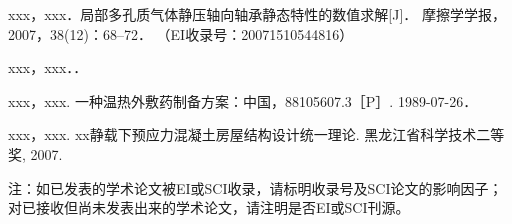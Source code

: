 


\begin{achievementlist}
\item[ {[1]} ]
xxx，xxx．局部多孔质气体静压轴向轴承静态特性的数值求解[J]．
摩擦学学报，2007，38(12)：68--72．
（EI收录号：20071510544816）
\item[ {[2]} ]
xxx，xxx．．
\end{achievementlist}


\begin{achievementlist}
\item[ {[1]} ]
xxx，xxx. 一种温热外敷药制备方案：中国，88105607.3［P］. 1989-07-26．
\end{achievementlist}

\begin{achievementlist}
\item[ {[1]} ]
xxx，xxx. xx静载下预应力混凝土房屋结构设计统一理论. 黑龙江省科学技术二等奖, 2007.
\end{achievementlist}

注：如已发表的学术论文被EI或SCI收录，请标明收录号及SCI论文的影响因子；对已接收但尚未发表出来的学术论文，请注明是否EI或SCI刊源。